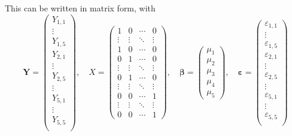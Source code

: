 \documentclass[a4paper]{article}
\begin{document}
\begin{eg}
  This can be written in matrix form, with
  \[
    \mathbf{Y} =
    \begin{pmatrix}
      Y_{1, 1}\\\vdots\\Y_{1, 5}\\
      Y_{2, 1}\\\vdots\\Y_{2, 5}\\
      \vdots\\
      Y_{5, 1}\\\vdots\\Y_{5, 5}\\
    \end{pmatrix}, \quad
    X =
    \begin{pmatrix}
      1 & 0 & \cdots & 0\\
      \vdots & \vdots & \ddots & \vdots\\
      1 & 0 & \cdots & 0\\
      0 & 1 & \cdots & 0\\
      \vdots & \vdots & \ddots & \vdots\\
      0 & 1 & \cdots& 0\\
      \vdots & \vdots & \ddots & \vdots\\
      0 & 0 & \cdots & 1\\
      \vdots & \vdots & \ddots & \vdots\\
      0 & 0 & \cdots & 1
    \end{pmatrix}, \quad
    \boldsymbol\beta =
    \begin{pmatrix}
      \mu_1\\ \mu_2\\ \mu_3\\ \mu_4\\ \mu_5
    \end{pmatrix}, \quad
    \boldsymbol\varepsilon =
    \begin{pmatrix}
      \varepsilon_{1, 1} \\ \vdots \\ \varepsilon_{1, 5}\\
      \varepsilon_{2, 1} \\ \vdots \\ \varepsilon_{2, 5}\\ \vdots\\
      \varepsilon_{5, 1} \\ \vdots \\ \varepsilon_{5, 5}\\
    \end{pmatrix}
\]
\end{eg}
\end{document}
